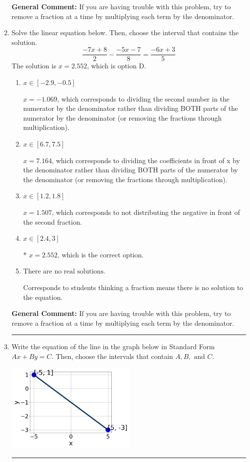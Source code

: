 \documentclass{extbook}[14pt]
\newcommand{\litem}[1]{\item #1

\rule{\textwidth}{0.4pt}}
\begin{document}
\begin{enumerate}
{\textbf{General Comment:} If you are having trouble with this problem, try to remove a fraction at a time by multiplying each term by the denominator.
}
\litem{
Solve the linear equation below. Then, choose the interval that contains the solution.
\[ \frac{-7x + 8}{2} - \frac{-5x -7}{8} = \frac{-6x + 3}{5} \]The solution is \( x = 2.552 \), which is option D.\begin{enumerate}[label=\Alph*.]
\item \( x \in [-2.9, -0.5] \)

 $x = -1.069$, which corresponds to dividing the second number in the numerator by the denominator rather than dividing BOTH parts of the numerator by the denominator (or removing the fractions through multiplication).
\item \( x \in [6.7, 7.5] \)

 $x = 7.164$, which corresponds to dividing the coefficients in front of x by the denominator rather than dividing BOTH parts of the numerator by the denominator (or removing the fractions through multiplication).
\item \( x \in [1.2, 1.8] \)

 $x = 1.507$, which corresponds to not distributing the negative in front of the second fraction.
\item \( x \in [2.4, 3] \)

* $x = 2.552$, which is the correct option.
\item \( \text{There are no real solutions.} \)

Corresponds to students thinking a fraction means there is no solution to the equation.
\end{enumerate}

\textbf{General Comment:} If you are having trouble with this problem, try to remove a fraction at a time by multiplying each term by the denominator.
}
\litem{
Write the equation of the line in the graph below in Standard Form $Ax+By=C$. Then, choose the intervals that contain $A, B, \text{ and } C$.

\begin{center}
    \includegraphics[width=0.5\textwidth]{../Figures/linearGraphToStandardCopyB.png}
\end{center}


}
\end{enumerate}
\end{document}

